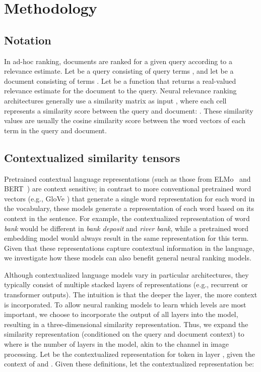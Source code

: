 \documentclass[sigconf]{acmart}
\begin{document}
 \section{Methodology}

\subsection{Notation}

In ad-hoc ranking, documents are ranked for a given query according to a relevance estimate. Let  be a query consisting of query terms , and let  be a document consisting of terms . Let  be a function that returns a real-valued relevance estimate for the document to the query. Neural relevance ranking architectures generally use a similarity matrix as input , where each cell represents a similarity score between the query and document: . These similarity values are usually the cosine similarity score between the word vectors of each term in the query and document.

\subsection{Contextualized similarity tensors}
Pretrained contextual language representations (such as those from ELMo~\cite{Peters:2018} and BERT~\cite{devlin2018bert}) are context sensitive; in contrast to more conventional pretrained word vectors (e.g., GloVe \cite{Pennington2014GloveGV}) that generate a single word representation for each word in the vocabulary, these models generate a representation of each word based on its context in the sentence. For example, the contextualized representation of word \textit{bank} would be different in \textit{bank deposit} and \textit{river bank}, while a pretrained word embedding model would always result in the same representation for this term. Given that these representations capture contextual information in the language, we investigate how these models can also benefit general neural ranking models.

Although contextualized language models vary in particular architectures, they typically consist of multiple stacked layers of representations (e.g., recurrent or transformer outputs). The intuition is that the deeper the layer, the more context is incorporated. To allow neural ranking models to learn which levels are most important, we choose to incorporate the output of all layers into the model, resulting in a three-dimensional similarity representation. Thus, we expand the similarity representation (conditioned on the query and document context) to  where  is the number of layers in the model, akin to the channel in image processing. Let  be the contextualized representation for token  in layer , given the context of  and .
Given these definitions, let the contextualized representation be:
\end{document}
